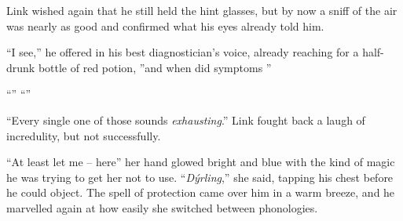 \documentclass[../../FGP.tex]{subfiles}
\begin{document}
Link wished again that he still held the hint glasses, but by now a sniff of the air was nearly as good and confirmed what his eyes already told him.

``I see,'' he offered in his best diagnostician's voice, already reaching for a half-drunk bottle of red potion, ''and when did symptoms ''

``''%
``''



``Every single one of those sounds \emph{exhausting}.'' Link fought back a laugh of incredulity, but not successfully. 

``At least let me -- here'' her hand glowed bright and blue with the
kind of magic he was trying to get her not to use. ``\emph{Dýrling},'' she said, tapping his chest before he could object. The spell of protection came over him in a warm breeze, and he marvelled again at how easily she switched between phonologies.
\end{document}
